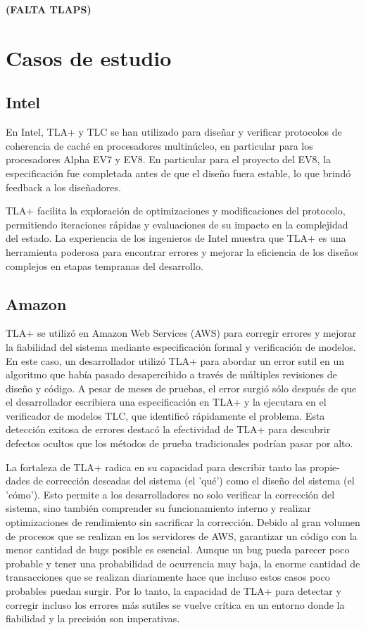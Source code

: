 \documentclass[runningheads]{llncs}
\begin{document}
\textbf{(FALTA TLAPS)}

\section{Casos de estudio}
\subsection{Intel}
En Intel, TLA+ y TLC se han utilizado para diseñar y verificar protocolos de coherencia de caché en procesadores multinúcleo, en particular para los procesadores Alpha EV7 y EV8. En particular para el proyecto del EV8, la especificación fue completada antes de que el diseño fuera estable, lo que brindó feedback a los diseñadores.

TLA+ facilita la exploración de optimizaciones y modificaciones del protocolo, permitiendo iteraciones rápidas y evaluaciones de su impacto en la complejidad del estado. La experiencia de los ingenieros de Intel muestra que TLA+ es una herramienta poderosa para encontrar errores y mejorar la eficiencia de los diseños complejos en etapas tempranas del desarrollo. \cite{tla}

\subsection{Amazon}
TLA+ se utilizó en Amazon Web Services (AWS) \cite{amazon} para corregir errores y mejorar la fiabilidad del sistema mediante especificación formal y verificación de modelos. En este caso, un desarrollador utilizó TLA+ para abordar un error sutil en un algoritmo que había pasado desapercibido a través de múltiples revisiones de diseño y código. A pesar de meses de pruebas, el error surgió sólo después de que el desarrollador escribiera una especificación en TLA+ y la ejecutara en el verificador de modelos TLC, que identificó rápidamente el problema. Esta detección exitosa de errores destacó la efectividad de TLA+ para descubrir defectos ocultos que los métodos de prueba tradicionales podrían pasar por alto.

La fortaleza de TLA+ radica en su capacidad para describir tanto las propie-\\dades de corrección deseadas del sistema (el 'qué') como el diseño del sistema (el 'cómo'). Esto permite a los desarrolladores no solo verificar la corrección del sistema, sino también comprender su funcionamiento interno y realizar optimizaciones de rendimiento sin sacrificar la corrección. Debido al gran volumen de procesos que se realizan en los servidores de AWS, garantizar un código con la menor cantidad de bugs posible es esencial. Aunque un bug pueda parecer poco probable y tener una probabilidad de ocurrencia muy baja, la enorme cantidad de transacciones que se realizan diariamente hace que incluso estos casos poco probables puedan surgir. Por lo tanto, la capacidad de TLA+ para detectar y corregir incluso los errores más sutiles se vuelve crítica en un entorno donde la fiabilidad y la precisión son imperativas.
\end{document}

